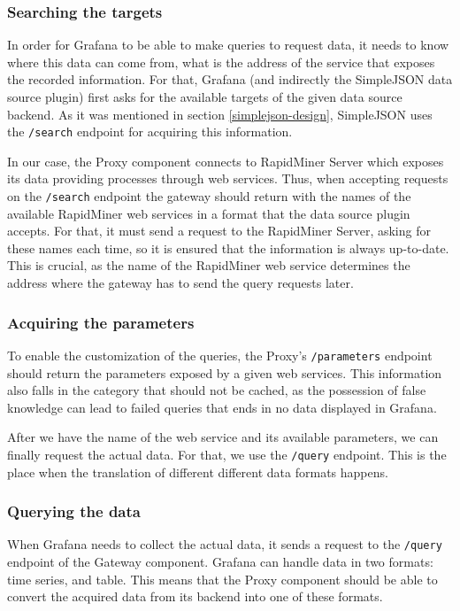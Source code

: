 \subsubsection{Searching the targets}

In order for Grafana to be able to make queries to request data, it needs to know where this data can come from, what is the address of the service that exposes the recorded information. For that, Grafana (and indirectly the SimpleJSON data source plugin) first asks for the available targets of the given data source backend. As it was mentioned in section \ref{simplejson-design}, SimpleJSON uses the \texttt{/search} endpoint for acquiring this information.

In our case, the Proxy component connects to RapidMiner Server which exposes its data providing processes through web services. Thus, when accepting requests on the \texttt{/search} endpoint the gateway should return with the names of the available RapidMiner web services in a format that the data source plugin accepts. For that, it must send a request to the RapidMiner Server, asking for these names each time, so it is ensured that the information is always up-to-date. This is crucial, as the name of the RapidMiner web service determines the address where the gateway has to send the query requests later.

\subsubsection{Acquiring the parameters}

To enable the customization of the queries, the Proxy's \texttt{/parameters} endpoint should return the parameters exposed by a given web services. This information also falls in the category that should not be cached, as the possession of false knowledge can lead to failed queries that ends in no data displayed in Grafana.

After we have the name of the web service and its available parameters, we can finally request the actual data. For that, we use the \texttt{/query} endpoint. This is the place when the translation of different different data formats happens.

\subsubsection{Querying the data}

When Grafana needs to collect the actual data, it sends a request to the \texttt{/query} endpoint of the Gateway component. Grafana can handle data in two formats: time series, and table. This means that the Proxy component should be able to convert the acquired data from its backend into one of these formats.

